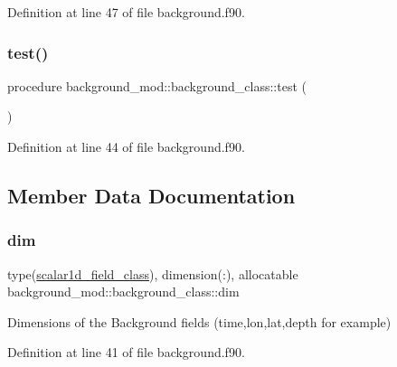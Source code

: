 Definition at line 47 of file background.\+f90.

\mbox{\label{structbackground__mod_1_1background__class_abe7c9e689ba522cbd15754980ef1cc47}} 
\subsubsection{\texorpdfstring{test()}{test()}}
{\footnotesize\ttfamily procedure background\+\_\+mod\+::background\+\_\+class\+::test (\begin{DoxyParamCaption}{ }\end{DoxyParamCaption})\hspace{0.3cm}{\ttfamily [private]}}



Definition at line 44 of file background.\+f90.



\subsection{Member Data Documentation}
\mbox{\label{structbackground__mod_1_1background__class_a086f319ce4f039190699578d69927013}} 
\subsubsection{\texorpdfstring{dim}{dim}}
{\footnotesize\ttfamily type(\mbox{\hyperlink{structfield__types__mod_1_1scalar1d__field__class}{scalar1d\+\_\+field\+\_\+class}}), dimension(\+:), allocatable background\+\_\+mod\+::background\+\_\+class\+::dim\hspace{0.3cm}{\ttfamily [private]}}



Dimensions of the Background fields (time,lon,lat,depth for example) 



Definition at line 41 of file background.\+f90.



